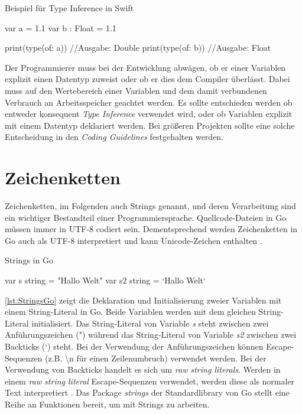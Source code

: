 \begin{listing}
\caption{Beispiel für Type Inference in Swift}
\label{lst:TypeInferenceSwift2}
\begin{SwiftCode}
var a = 1.1
var b : Float = 1.1

print(type(of: a)) //Ausgabe: Double
print(type(of: b)) //Ausgabe: Float
\end{SwiftCode}
\end{listing}

Der Programmierer muss bei der Entwicklung abwägen, ob er einer Variablen explizit einen Datentyp zuweist oder ob er dies dem Compiler überlässt. 
Dabei muss auf den Wertebereich einer Variablen und dem damit verbundenen Verbrauch an Arbeitsspeicher geachtet werden. 
Es sollte entschieden werden ob entweder konsequent \emph{Type Inference} verwendet wird, oder ob Variablen explizit mit einem Datentyp deklariert werden. 
Bei größeren Projekten sollte eine solche Entscheidung in den \emph{Coding Guidelines} festgehalten werden.

\section{Zeichenketten}
Zeichenketten, im Folgenden auch Strings genannt, und deren Verarbeitung sind ein wichtiger Bestandteil einer Programmiersprache. 
Quellcode-Dateien in Go müssen immer in UTF-8 codiert sein. 
Dementsprechend werden Zeichenketten in Go auch als UTF-8 interpretiert und kann Unicode-Zeichen enthalten \cite[S.117]{Donovan.2016}.

\begin{listing}
\caption{Strings in Go}
\label{lst:StringsGo}
\begin{GoCode}
var s string = "Hallo Welt"
var s2 string = `Hallo Welt`
\end{GoCode}
\end{listing}

\autoref{lst:StringsGo} zeigt die Deklaration und Initialisierung zweier Variablen mit einem String-Literal in Go.
Beide Variablen werden mit dem gleichen String-Literal initialisiert. 
Das String-Literal von Variable \emph{s} steht zwischen zwei Anführungszeichen (") während das String-Literal von Variable \emph{s2} zwischen zwei Backticks (`) steht.
Bei der Verwendung der Anführungszeichen können Escape-Sequenzen (z.B. {\textbackslash}n für einen Zeilenumbruch) verwendet werden.
Bei der Verwendung von Backticks handelt es sich um \emph{raw string literals}. 
Werden in einem \emph{raw string literal} Escape-Sequenzen verwendet, werden diese als normaler Text interpretiert \cite[S.118]{Donovan.2016}.
Das Package \emph{strings} der Standardlibrary von Go stellt eine Reihe an Funktionen bereit, um mit Strings zu arbeiten.

